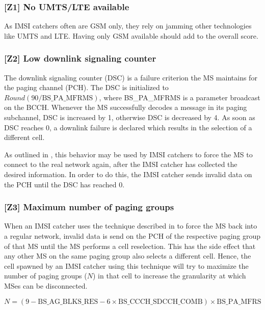 \documentclass[a4paper,11pt,notitlepage,bigheadings,oneside]{scrartcl}
\begin{document}
\subsubsection{[Z1] No UMTS/LTE available}

As IMSI catchers often are GSM only, they rely on jamming other technologies
like UMTS and LTE. Having only GSM available should add to the overall score.

\subsubsection{[Z2] Low downlink signaling counter}

The downlink signaling counter (DSC) is a failure criterion the MS maintains
for the paging channel (PCH). The DSC is initialized to
$Round(90/\text{BS\_PA\_MFRMS})$, where BS\_PA\_MFRMS is a parameter broadcast
on the BCCH. Whenever the MS successfully decodes a message in its paging
subchannel, DSC is increased by 1, otherwise DSC is decreased by 4. As soon as
DSC reaches 0, a downlink failure is declared which results in the selection of
a different cell.

As outlined in \cite{bott2000verfahren}, this behavior may be used by IMSI
catchers to force the MS to connect to the real network again, after the IMSI
catcher has collected the desired information. In order to do this, the IMSI
catcher sends invalid data on the PCH until the DSC has reached 0.

\subsubsection{[Z3] Maximum number of paging groups}

When an IMSI catcher uses the technique described in
\cite[0021]{bott2000verfahren} to force the MS back into a regular network,
invalid data is send on the PCH of the respective paging group of that MS until
the MS performs a cell reselection. This has the side effect that any other MS
on the same paging group also selects a different cell. Hence, the cell spawned
by an IMSI catcher using this technique will try to maximize the number of
paging groups ($N$) in that cell to increase the granularity at which MSes can
be disconnected.

${N} = (9 - {\text{BS\_AG\_BLKS\_RES}} - 6\times {\text{BS\_CCCH\_SDCCH\_COMB}})\times {\text{BS\_PA\_MFRS}}$

\end{document}
